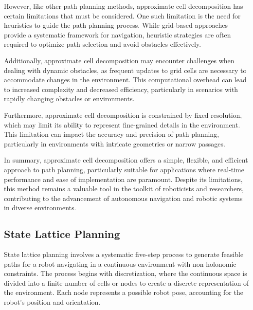 \vspace*{6mm}

However, like other path planning methods, approximate cell decomposition has certain limitations that must be considered. One such limitation is the need for heuristics to guide the path planning process. While grid-based approaches provide a systematic framework for navigation, heuristic strategies are often required to optimize path selection and avoid obstacles effectively.

\vspace*{6mm}

Additionally, approximate cell decomposition may encounter challenges when dealing with dynamic obstacles, as frequent updates to grid cells are necessary to accommodate changes in the environment. This computational overhead can lead to increased complexity and decreased efficiency, particularly in scenarios with rapidly changing obstacles or environments.

\vspace*{6mm}

Furthermore, approximate cell decomposition is constrained by fixed resolution, which may limit its ability to represent fine-grained details in the environment. This limitation can impact the accuracy and precision of path planning, particularly in environments with intricate geometries or narrow passages.

\vspace*{6mm}

In summary, approximate cell decomposition offers a simple, flexible, and efficient approach to path planning, particularly suitable for applications where real-time performance and ease of implementation are paramount. Despite its limitations, this method remains a valuable tool in the toolkit of roboticists and researchers, contributing to the advancement of autonomous navigation and robotic systems in diverse environments.

\subsection{State Lattice Planning}

State lattice planning involves a systematic five-step process to generate feasible paths for a robot navigating in a continuous environment with non-holonomic constraints. The process begins with discretization, where the continuous space is divided into a finite number of cells or nodes to create a discrete representation of the environment. Each node represents a possible robot pose, accounting for the robot's position and orientation.

